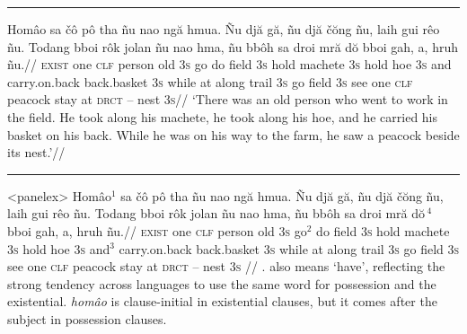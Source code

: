 \filbreak\hrule\medskip

\begingroup
\ex[glftpos=right,glhangstyle=none]
\let\\=\textsc
\begingl
\gla
Hom\^{a}o sa \v{c}\^{o} p\^{o} tha  \~{n}u nao ng\u{a} hmua. \~{N}u
dj\u{a} g\u{a}, \~{n}u dj\u{a} \v{c}\u{o}ng \~{n}u, laih gui r\^{e}o
\~{n}u. Todang bboi r\^{o}k jolan \~{n}u nao hma, \~{n}u bb\^{o}h sa
droi mr\u{a} d\u{o} bboi gah, a, hruh \~{n}u.//
\glb
\\{exist} one \\{clf} person old \\{3s} go do field \\{3s} hold
machete \\{3s} hold hoe \\{3s} and carry.on.back back.basket \\{3s}
while at along trail \\{3s} go field \\{3s} see one \\{clf} peacock
stay at \\{drct} -- nest \\{3s}//
\glft
`There was an old person who went to work in the field. He took
along his machete, he took along his hoe, and he carried his
basket on his back. While he was on his way to the farm, he saw a
peacock beside its nest.'//
\endgl
\xe
\endgroup
\bigskip

\filbreak\hrule\medskip

\begingroup
\ex[everypanel=\footnotesize]<panelex>
\let\\=\textsc
\beginglpanel[ssratio=.5,glhangstyle=none]
\gla Hom\^{a}o$^1$ sa \v{c}\^{o} p\^{o} tha  \~{n}u nao ng\u{a}
hmua. \~{N}u dj\u{a} g\u{a}, \~{n}u dj\u{a} \v{c}\u{o}ng \~{n}u,
laih gui r\^{e}o \~{n}u. Todang bboi r\^{o}k jolan \~{n}u nao
hma, \~{n}u bb\^{o}h sa droi mr\u{a} d\u{o}$\,^4$ bboi gah, a, hruh
\~{n}u.//
\glb \\{exist} one \\{clf} person old \\{3s} go$^2$ do field
\\{3s} hold machete \\{3s} hold hoe \\{3s} and$^3$ carry.on.back
back.basket \\{3s} while at along trail \\{3s} go field \\{3s}
see one \\{clf} peacock stay at \\{drct} -- nest \\{3s}
//
. also means `have', reflecting the
strong tendency across languages to use the same word for
possession and the existential. {\it hom\^{a}o} is clause-initial
in existential clauses, but it comes after the subject in
possession clauses.

